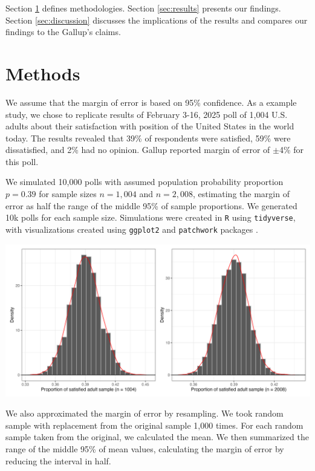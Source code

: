 \documentclass{article}\usepackage[]{graphicx}\usepackage[]{xcolor}
\newenvironment{Figure}
  {\par\medskip\noindent\minipage{\linewidth}}
  {\endminipage\par\medskip}
\begin{document}
\begin{multicols}{2}
Section \ref{sec:methods} defines methodologies. Section \ref{sec:results} presents our findings. Section \ref{sec:discussion} discusses the implications of the results and compares our findings to the Gallup's claims.



\section{Methods}\label{sec:methods}
We assume that the margin of error is based on 95\% confidence. As a example study, we chose to replicate results of February 3-16, 2025 poll of 1,004 U.S. adults about their satisfaction with position of the United States in the world today. The results revealed that 39\% of respondents were satisfied, 59\% were dissatisfied, and 2\% had no opinion. Gallup reported margin of error of $\pm$4\% for this poll.

We simulated 10,000 polls with assumed population probability proportion $p=0.39$ for sample sizes $n=1,004$ and $n=2,008$, estimating the margin of error as half the range of the middle 95\% of sample proportions. We generated 10k polls for each sample size. Simulations were created in \texttt{R} using \texttt{tidyverse}, with visualizations created using \texttt{ggplot2} and \texttt{patchwork} packages \citep{tidyverse, ggplot, patchwork}.

\begin{Figure} 
 \centering
 \includegraphics[width=\linewidth]{simulation.png}
 \label{fig:sim}
\end{Figure}

We also approximated the margin of error by resampling. We took random sample with replacement from the original sample 1,000 times. For each random sample taken from the original, we calculated the mean. We then summarized the range of the middle 95\% of mean values, calculating the margin of error by reducing the interval in half.


\end{multicols}
\end{document}
